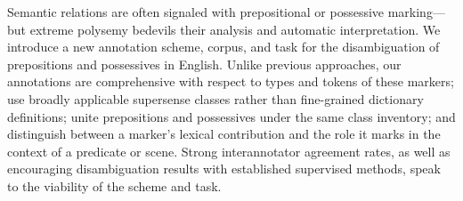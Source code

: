 Semantic relations are often signaled with prepositional or possessive marking—but extreme polysemy bedevils their analysis and automatic interpretation. We introduce a new annotation scheme, corpus, and task for the disambiguation of prepositions and possessives in English. Unlike previous approaches, our annotations are comprehensive with respect to types and tokens of these markers; use broadly applicable supersense classes rather than fine-grained dictionary definitions; unite prepositions and possessives under the same class inventory; and distinguish between a marker's lexical contribution and the role it marks in the context of a predicate or scene. Strong interannotator agreement rates, as well as encouraging disambiguation results with established supervised methods, speak to the viability of the scheme and task.
